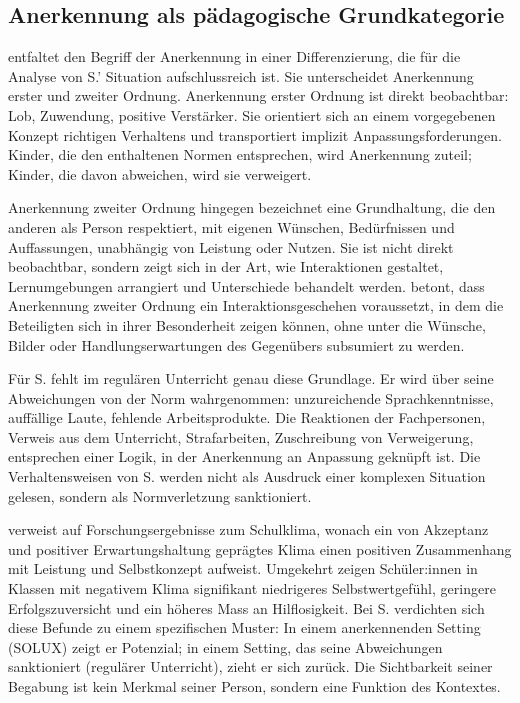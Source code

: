 \documentclass[ngerman, a4paper]{article}
\begin{document}
\subsection{Anerkennung als pädagogische Grundkategorie}

\textcite{grossrieder2010anerkennung} entfaltet den Begriff der Anerkennung in einer Differenzierung, die für
die Analyse von S.' Situation aufschlussreich ist. Sie unterscheidet Anerkennung
erster und zweiter Ordnung. Anerkennung erster Ordnung ist direkt beobachtbar: Lob,
Zuwendung, positive Verstärker. Sie orientiert sich an einem vorgegebenen Konzept
richtigen Verhaltens und transportiert implizit Anpassungsforderungen. Kinder, die den
enthaltenen Normen entsprechen, wird Anerkennung zuteil; Kinder, die davon abweichen,
wird sie verweigert.

Anerkennung zweiter Ordnung hingegen bezeichnet eine Grundhaltung, die den anderen als
Person respektiert, mit eigenen Wünschen, Bedürfnissen und Auffassungen, unabhängig
von Leistung oder Nutzen. Sie ist nicht direkt beobachtbar, sondern zeigt sich in der
Art, wie Interaktionen gestaltet, Lernumgebungen arrangiert und Unterschiede behandelt
werden. \textcite{grossrieder2010anerkennung} betont, dass Anerkennung zweiter Ordnung ein
Interaktionsgeschehen voraussetzt, in dem die Beteiligten sich in ihrer Besonderheit
zeigen können, ohne unter die Wünsche, Bilder oder Handlungserwartungen des
Gegenübers subsumiert zu werden.

Für S. fehlt im regulären Unterricht genau diese Grundlage. Er wird über seine
Abweichungen von der Norm wahrgenommen: unzureichende Sprachkenntnisse,
auffällige Laute, fehlende Arbeitsprodukte. Die Reaktionen der Fachpersonen,
Verweis aus dem Unterricht, Strafarbeiten, Zuschreibung von Verweigerung,
entsprechen einer Logik, in der Anerkennung an Anpassung geknüpft ist. Die
Verhaltensweisen von S. werden nicht als Ausdruck einer komplexen Situation gelesen,
sondern als Normverletzung sanktioniert.

\textcite{grossrieder2010anerkennung} verweist auf Forschungsergebnisse zum Schulklima, wonach ein von
Akzeptanz und positiver Erwartungshaltung geprägtes Klima einen positiven Zusammenhang
mit Leistung und Selbstkonzept aufweist. Umgekehrt zeigen Schüler:innen in Klassen mit
negativem Klima signifikant niedrigeres Selbstwertgefühl, geringere Erfolgszuversicht
und ein höheres Mass an Hilflosigkeit. Bei S. verdichten sich diese Befunde zu einem
spezifischen Muster: In einem anerkennenden Setting (SOLUX) zeigt er Potenzial; in
einem Setting, das seine Abweichungen sanktioniert (regulärer Unterricht), zieht er
sich zurück. Die Sichtbarkeit seiner Begabung ist kein Merkmal seiner Person, sondern
eine Funktion des Kontextes.
\end{document}
